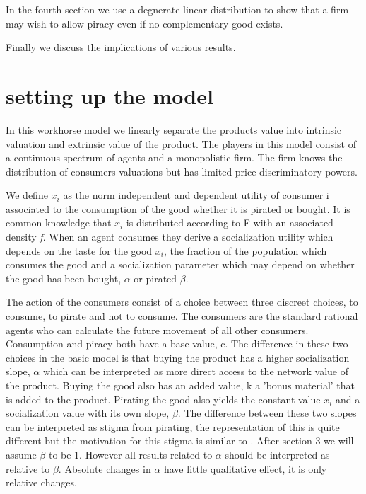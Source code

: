 \documentclass{article}
\begin{document}
In the fourth section we use a degnerate linear distribution to show that a firm may wish to allow piracy even if no complementary good exists. 

Finally we discuss the implications of various results. 

\section{setting up the model}

In this workhorse model we linearly separate the products value into intrinsic valuation and extrinsic value of the product. The players in this model consist of a continuous spectrum of agents and a monopolistic firm. The firm knows the distribution of consumers valuations but  has limited price discriminatory powers. 

We define $x_i$ as the norm independent and dependent utility of consumer i associated to the consumption of the good whether it is pirated or bought. It is common knowledge that $x_i$ is distributed according to F with an associated density \textit{f}. When an agent consumes they derive a socialization utility which depends on the taste for the good $x_i$, the fraction of the population which consumes the good and a socialization parameter which may depend on whether the good has been bought, $\alpha$ or pirated $\beta$. 

The action of the consumers consist of a choice between three discreet choices, to consume, to pirate and not to consume. The consumers are the standard rational agents who can calculate the future movement of all other consumers. Consumption and piracy both have a base value, c. The difference in these two choices in the basic model is that buying the product has a higher socialization slope, $\alpha$ which can be interpreted as more direct access to the network value of the product. Buying the good also has an added value, k a 'bonus material' that is added to the product.  Pirating the good also yields the constant value $x_i$ and a socialization value with its own slope, $\beta$. The difference between these two slopes can be interpreted as stigma from pirating, the representation of this is quite different but the motivation for this stigma is similar to  \cite{CRP91}. After section 3 we will assume $\beta$ to be 1. However all results related to $\alpha$ should be interpreted as relative to $\beta$. Absolute changes in $\alpha$ have little qualitative effect, it is only relative changes. 
\end{document}
